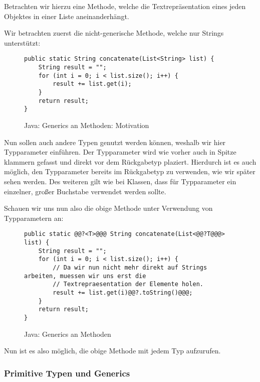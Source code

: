 		Betrachten wir hierzu eine Methode, welche die Textrepräsentation eines jeden Objektes in einer Liste aneinanderhängt.
		
		Wir betrachten zuerst die nicht-generische Methode, welche nur Strings unterstützt:
		\begin{figure}[H]
			\centering
			\begin{lstlisting}
public static String concatenate(List<String> list) {
	String result = "";
	for (int i = 0; i < list.size(); i++) {
		result += list.get(i);
	}
	return result;
}
			\end{lstlisting}
			\caption{Java: Generics an Methoden: Motivation}
		\end{figure}
		
		Nun sollen auch andere Typen genutzt werden können, weshalb wir hier Typparameter einführen. Der Typparameter wird wie vorher auch in Spitze klammern gefasst und direkt vor dem Rückgabetyp plaziert. Hierdurch ist es auch möglich, den Typparameter bereits im Rückgabetyp zu verwenden, wie wir später sehen werden. Des weiteren gilt wie bei Klassen, dass für Typparameter ein einzelner, großer Buchstabe verwendet werden sollte.
		
		Schauen wir uns nun also die obige Methode unter Verwendung von Typparametern an:
		\begin{figure}[H]
			\centering
			\begin{lstlisting}
public static @@?<T>@@@ String concatenate(List<@@?T@@@> list) {
	String result = "";
	for (int i = 0; i < list.size(); i++) {
		// Da wir nun nicht mehr direkt auf Strings arbeiten, muessen wir uns erst die
		// Textrepraesentation der Elemente holen.
		result += list.get(i)@@?.toString()@@@;
	}
	return result;
}
			\end{lstlisting}
			\caption{Java: Generics an Methoden}
			\label{fig:generics_methoden}
		\end{figure}
		
		Nun ist es also möglich, die obige Methode mit jedem Typ aufzurufen.
	
	\subsubsection{Primitive Typen und Generics}
		\label{sec:generics_primitive_typen}
	
